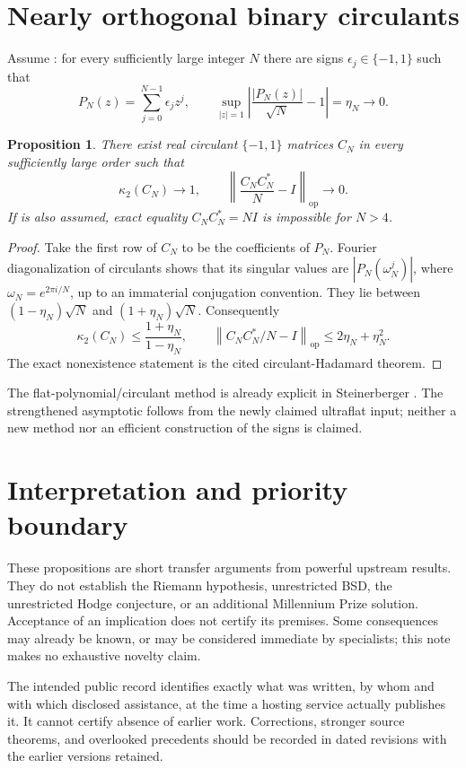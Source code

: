 \documentclass[11pt]{article}
\newtheorem{proposition}[theorem]{Proposition}
\theoremstyle{definition}
\theoremstyle{remark}
\begin{document}
\section{Nearly orthogonal binary circulants}
Assume \cite[Theorem 1, p.~1]{ultraflat}: for every sufficiently large integer $N$ there are signs $\epsilon_j\in\{-1,1\}$ such that
\[
P_N(z)=\sum_{j=0}^{N-1}\epsilon_jz^j,\qquad
\sup_{|z|=1}\left|\frac{|P_N(z)|}{\sqrt N}-1\right|=\eta_N\longrightarrow0.
\]
\begin{proposition}
There exist real circulant $\{-1,1\}$ matrices $C_N$ in every sufficiently large order such that
\[
\kappa_2(C_N)\longrightarrow1,\qquad
\left\|\frac{C_NC_N^*}{N}-I\right\|_{\mathrm{op}}\longrightarrow0.
\]
If \cite[Theorem 1.1, p.~1]{circulant} is also assumed, exact equality $C_NC_N^*=NI$ is impossible for $N>4$.
\end{proposition}
\begin{proof}
Take the first row of $C_N$ to be the coefficients of $P_N$. Fourier diagonalization of circulants shows that its singular values are $|P_N(\omega_N^j)|$, where $\omega_N=e^{2\pi i/N}$, up to an immaterial conjugation convention. They lie between $(1-\eta_N)\sqrt N$ and $(1+\eta_N)\sqrt N$. Consequently
\[
\kappa_2(C_N)\le\frac{1+\eta_N}{1-\eta_N},\qquad
\left\|C_NC_N^*/N-I\right\|_{\mathrm{op}}\le2\eta_N+\eta_N^2.
\]
The exact nonexistence statement is the cited circulant-Hadamard theorem.
\end{proof}
The flat-polynomial/circulant method is already explicit in Steinerberger \cite{steinerberger}. The strengthened asymptotic follows from the newly claimed ultraflat input; neither a new method nor an efficient construction of the signs is claimed.



\section{Interpretation and priority boundary}
These propositions are short transfer arguments from powerful upstream results. They do not establish the Riemann hypothesis, unrestricted BSD, the unrestricted Hodge conjecture, or an additional Millennium Prize solution. Acceptance of an implication does not certify its premises. Some consequences may already be known, or may be considered immediate by specialists; this note makes no exhaustive novelty claim.

The intended public record identifies exactly what was written, by whom and with which disclosed assistance, at the time a hosting service actually publishes it. It cannot certify absence of earlier work. Corrections, stronger source theorems, and overlooked precedents should be recorded in dated revisions with the earlier versions retained.

\begingroup\small

\endgroup
\end{document}
